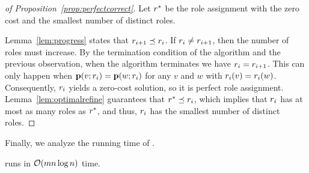 \begin{proof}[of Proposition~\ref{prop:perfectcorrect}]
Let $r^*$ be the role assignment with the zero cost and the smallest
number of distinct roles.

Lemma~\ref{lem:progress} states that $r_{i + 1} \preceq r_i$. 
If $r_i \neq r_{i + 1}$, then the number of roles must increase. 
By the termination condition of the algorithm
and the previous observation, 
when the algorithm terminates we have $r_{i} = r_{i + 1}$. 
This can only happen when
$\prof{v; \role_i} = \prof{w; \role_i}$ for any $v$ and $w$ with $r_i(v) = r_i(w)$. 
Consequently, $r_i$ yields a zero-cost solution, so it is perfect role assignment. 
Lemma~\ref{lem:optimalrefine} guarantees that $r^* \preceq r_i$, 
which implies that $r_i$ has at most as many roles as $r^*$, 
and thus, $r_i$ has the smallest number of distinct roles.
\end{proof}
\fi

Finally, we analyze the running time of \algperfect.

\begin{proposition}
\algperfect runs in $\bigO{mn \log n}$ time.
\label{prop:exacttime}
\end{proposition}

